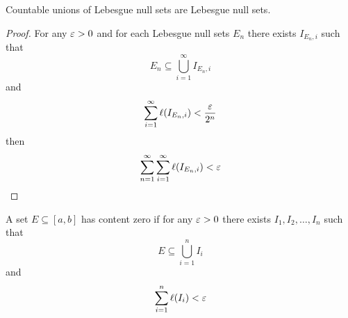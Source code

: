 \begin{lemma}
  Countable unions of Lebesgue null sets are Lebesgue null sets.
\end{lemma}

\begin{proof}
  For any $\varepsilon > 0$ and for each Lebesgue null sets $E_n$ there exists $I_{E_n, i}$ such that 
  \[E_n \subseteq \bigcup_{i=1}^{\infty}I_{E_n, i}\] and \[ \sum_{i=1}^{\infty}\ell(I_{E_n, i}) < \frac{\varepsilon}{2^n}\]
  then
  \[ \sum_{n=1}^{\infty}\sum_{i=1}^{\infty}\ell(I_{E_n, i}) < \varepsilon\]
\end{proof}

\begin{definition}
  A set $E\subseteq [a, b]$ has content zero if for any $\varepsilon > 0$ there exists $I_1, I_2, \ldots, I_n$ such that
  \[E \subseteq \bigcup_{i=1}^{n}I_i\]
  and
  \[\sum_{i=1}^{n}\ell(I_i) < \varepsilon\] 
\end{definition}